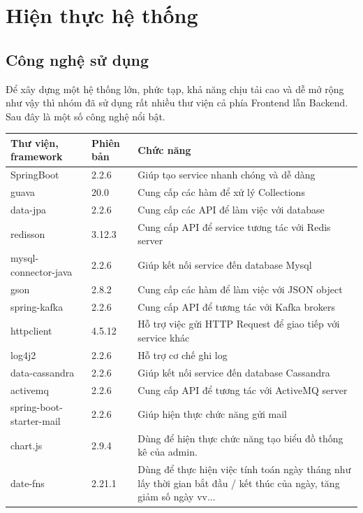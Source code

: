 \chapter{Hiện thực hệ thống}

\section{Công nghệ sử dụng}

	Để xây dựng một hệ thống lớn, phức tạp, khả năng chịu tải cao và dễ mở rộng như vậy thì nhóm đã sử dụng rất nhiều thư viện cả phía Frontend lẫn Backend. Sau đây là một số công nghệ nổi bật.
	
	\begin{table}[!htp]
		\centering\begin{tabular}{|l|l|m{20em}|}
			\hline 
			\textbf{Thư viện, framework} & \textbf{Phiên bản} & \textbf{Chức năng}\\
			\hline 
			SpringBoot & 2.2.6 & Giúp tạo service nhanh chóng và dễ dàng  \\
			\hline 
			guava & 20.0 & Cung cấp các hàm để xử lý Collections \\
			\hline 
			data-jpa & 2.2.6 & Cung cấp các API để làm việc với database \\
			\hline 
			redisson & 3.12.3 & Cung cấp API để service tương tác với Redis server\\
			\hline 
			mysql-connector-java & 2.2.6 & Giúp kết nối service đến database Mysql \\
			\hline 
			gson & 2.8.2 & Cung cấp các hàm để làm việc với JSON object \\
			\hline 
			spring-kafka &  2.2.6 & Cung cấp API để tương tác với Kafka brokers \\
			\hline 
			httpclient & 4.5.12 & Hỗ trợ việc gửi HTTP Request để giao tiếp với service khác \\
			\hline 
			log4j2 &  2.2.6 & Hỗ trợ cơ chế ghi log \\
			\hline 
			data-cassandra & 2.2.6 & Giúp kết nối service đến database Cassandra \\
			\hline 
			activemq & 2.2.6  & Cung cấp API để tương tác với ActiveMQ server \\
			\hline 
			spring-boot-starter-mail & 2.2.6 & Giúp hiện thực chức năng gửi mail \\
			\hline
			chart.js & 2.9.4 & Dùng để hiện thực chức năng tạo biểu đồ thống kê của admin. \\
			\hline
			date-fns & 2.21.1 & Dùng để thực hiện việc tính toán ngày tháng như lấy thời gian bắt đầu / kết thúc của ngày, tăng giảm số ngày vv... \\

\end{tabular}
\end{table}
